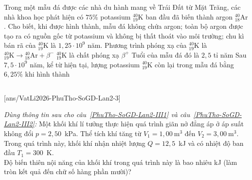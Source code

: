 	\begin{ex}%
		Trong một mẫu đá được các nhà du hành mang về Trái Đất từ Mặt Trăng, các nhà khoa học phát hiện có $75\%$ potassium ${}^{40}_{19}\text{K}$ ban đầu đã biến thành argon ${}^{40}_{18}\text{Ar}$. Cho biết, khi được hình thành, mẫu đá không chứa argon; toàn bộ argon được tạo ra có nguồn gốc từ potassium và không bị thất thoát vào môi trường; chu kì bán rã của ${}^{40}_{19}\text{K}$ là $1{,}25\cdot 10^9$ năm.
		\choiceTFt
		{Phương trình phóng xạ của ${}^{40}_{19}\text{K}$ là ${}^{40}_{19}\text{K}\to{}^{40}_{18}\text{Ar}+\beta^-$}
		{\True ${}^{40}_{19}\text{K}$ là chất phóng xạ $\beta^+$}
		{\True Tuổi của mẫu đá đó là $2{,}5$ tỉ năm}
		{Sau $7{,}5\cdot 10^9$ năm, kể từ hiện tại, lượng potassium ${}^{40}_{19}\text{K}$ còn lại trong mẫu đá bằng $6{,}25\%$ khi hình thành}
	\end{ex}

	\subsection*{}
	\setcounter{ex}{0}
	[ans/VatLi2026-PhuTho-SoGD-Lan2-3]

	\begin{ex}%
		\label{PhuTho-SoGD-Lan2-III1}\textit{Dùng thông tin sau cho câu~\ref{PhuTho-SoGD-Lan2-III1} và câu~\ref{PhuTho-SoGD-Lan2-III2}:} Một khối khí lí tưởng thực hiện quá trình giãn nở đẳng áp ở áp suất không đổi $p=2{,}50$~kPa. Thể tích khí tăng từ $V_1=1{,}00~\text{m}^3$ đến $V_2=3{,}00~\text{m}^3$. Trong quá trình này, khối khí nhận nhiệt lượng $Q=12{,}5$~kJ và có nhiệt độ ban đầu $T_1=300$~K.\\
		Độ biến thiên nội năng của khối khí trong quá trình này là bao nhiêu kJ (làm tròn kết quả đến chữ số hàng phần mười)?
		\par
	\end{ex}

